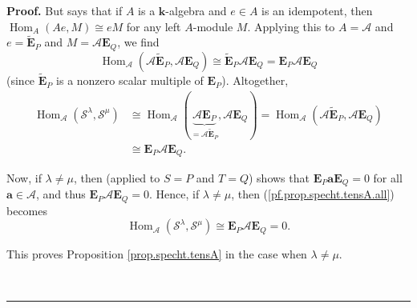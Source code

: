 \documentclass[numbers=enddot,12pt,final,onecolumn,notitlepage]{scrartcl}%
\theoremstyle{definition}
\newenvironment{proof}[1][Proof]{\noindent\textbf{#1.} }{\ \rule{0.5em}{0.5em}}
\begin{document}
\begin{proof}
But \cite[Lemma 5.13.4]{Etingof-et-al} says that if $A$ is a $\mathbf{k}%
$-algebra and $e\in A$ is an idempotent, then $\operatorname*{Hom}%
\nolimits_{A}\left(  Ae,M\right)  \cong eM$ for any left $A$-module $M$.
Applying this to $A=\mathcal{A}$ and $e=\widetilde{\mathbf{E}}_{P}$ and
$M=\mathcal{A}\mathbf{E}_{Q}$, we find%
\[
\operatorname*{Hom}\nolimits_{\mathcal{A}}\left(  \mathcal{A}%
\widetilde{\mathbf{E}}_{P},\mathcal{A}\mathbf{E}_{Q}\right)  \cong%
\widetilde{\mathbf{E}}_{P}\mathcal{A}\mathbf{E}_{Q}=\mathbf{E}_{P}%
\mathcal{A}\mathbf{E}_{Q}%
\]
(since $\widetilde{\mathbf{E}}_{P}$ is a nonzero scalar multiple of
$\mathbf{E}_{P}$). Altogether,%
\begin{align}
\operatorname*{Hom}\nolimits_{\mathcal{A}}\left(  \mathcal{S}^{\lambda
},\mathcal{S}^{\mu}\right)   &  \cong\operatorname*{Hom}\nolimits_{\mathcal{A}%
}\left(  \underbrace{\mathcal{A}\mathbf{E}_{P}}_{=\mathcal{A}%
\widetilde{\mathbf{E}}_{P}},\mathcal{A}\mathbf{E}_{Q}\right)
=\operatorname*{Hom}\nolimits_{\mathcal{A}}\left(  \mathcal{A}%
\widetilde{\mathbf{E}}_{P},\mathcal{A}\mathbf{E}_{Q}\right) \nonumber\\
&  \cong\mathbf{E}_{P}\mathcal{A}\mathbf{E}_{Q}.
\label{pf.prop.specht.tensA.all}%
\end{align}


Now, if $\lambda\neq\mu$, then \cite[Proposition 5.11.15]{sga} (applied to
$S=P$ and $T=Q$) shows that $\mathbf{E}_{P}\mathbf{aE}_{Q}=0$ for all
$\mathbf{a}\in\mathcal{A}$, and thus $\mathbf{E}_{P}\mathcal{A}\mathbf{E}%
_{Q}=0$. Hence, if $\lambda\neq\mu$, then (\ref{pf.prop.specht.tensA.all})
becomes%
\begin{equation}
\operatorname*{Hom}\nolimits_{\mathcal{A}}\left(  \mathcal{S}^{\lambda
},\mathcal{S}^{\mu}\right)  \cong\mathbf{E}_{P}\mathcal{A}\mathbf{E}_{Q}=0.
\label{pf.prop.specht.tensA.distinct}%
\end{equation}


This proves Proposition \ref{prop.specht.tensA} in the case when $\lambda
\neq\mu$.


\end{proof}
\end{document}

